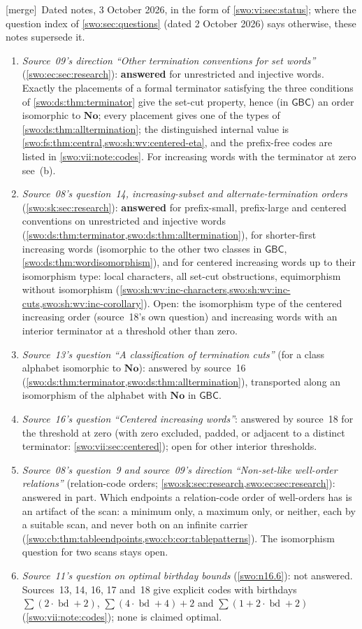 \documentclass[11pt]{article}
\theoremstyle{definition}
\theoremstyle{remark}
\newcommand{\No}{\mathbf{No}}
\newcommand{\bd}{\operatorname{bd}}
\newcommand{\GBC}{\mathsf{GBC}}
\newcommand{\merge}{\textsf{[merge]}}
\begin{document}
\merge\ Dated notes, 3 October 2026, in the form of \cref{swo:vi:sec:status};
where the question index of \cref{swo:sec:questions} (dated 2 October 2026)
says otherwise, these notes supersede it.
\begin{enumerate}[label=(\alph*)]
\item \emph{Source~09's direction ``Other termination conventions for set
words''} (\cref{swo:ec:sec:research}): \textbf{answered} for unrestricted and
injective words. Exactly the placements of a formal terminator satisfying the
three conditions of \cref{swo:ds:thm:terminator} give the set-cut property,
hence (in $\GBC$) an order isomorphic to $\No$; every placement gives one of
the types of \cref{swo:ds:thm:alltermination}; the distinguished internal value
is \cref{swo:fs:thm:central,swo:sh:wv:centered-eta}, and the prefix-free codes
are listed in \cref{swo:vii:note:codes}. For increasing words with the
terminator at zero see~(b).
\item \emph{Source~08's question~14, increasing-subset and alternate-termination
orders} (\cref{swo:sk:sec:research}): \textbf{answered} for prefix-small,
prefix-large and centered conventions on unrestricted and injective words
(\cref{swo:ds:thm:terminator,swo:ds:thm:alltermination}), for shorter-first
increasing words (isomorphic to the other two classes in $\GBC$,
\cref{swo:ds:thm:wordisomorphism}), and for centered increasing words up to
their isomorphism type: local characters, all set-cut obstructions,
equimorphism without isomorphism (\cref{swo:sh:wv:inc-characters,swo:sh:wv:inc-cuts,swo:sh:wv:inc-corollary}).
Open: the isomorphism type of the centered increasing order (source~18's own
question) and increasing words with an interior terminator at a threshold
other than zero.
\item \emph{Source~13's question ``A classification of termination cuts''} (for
a class alphabet isomorphic to $\No$): answered by source~16
(\cref{swo:ds:thm:terminator,swo:ds:thm:alltermination}), transported along an
isomorphism of the alphabet with $\No$ in $\GBC$.
\item \emph{Source~16's question ``Centered increasing words''}: answered by
source~18 for the threshold at zero (with zero excluded, padded, or adjacent
to a distinct terminator: \cref{swo:vii:sec:centered}); open for other
interior thresholds.
\item \emph{Source~08's question~9 and source~09's direction ``Non-set-like
well-order relations''} (relation-code orders; \cref{swo:sk:sec:research,swo:ec:sec:research}):
answered in part. Which endpoints a relation-code order of well-orders has is
an artifact of the scan: a minimum only, a maximum only, or neither, each by a
suitable scan, and never both on an infinite carrier
(\cref{swo:cb:thm:tableendpoints,swo:cb:cor:tablepatterns}). The isomorphism
question for two scans stays open.
\item \emph{Source~11's question on optimal birthday bounds} (\cref{swo:n16.6}):
not answered. Sources~13, 14, 16, 17 and~18 give explicit codes with birthdays
$\sum(2\cdot\bd+2)$, $\sum(4\cdot\bd+4)+2$ and $\sum(1+2\cdot\bd+2)$
(\cref{swo:vii:note:codes}); none is claimed optimal.
\end{enumerate}
\end{document}
